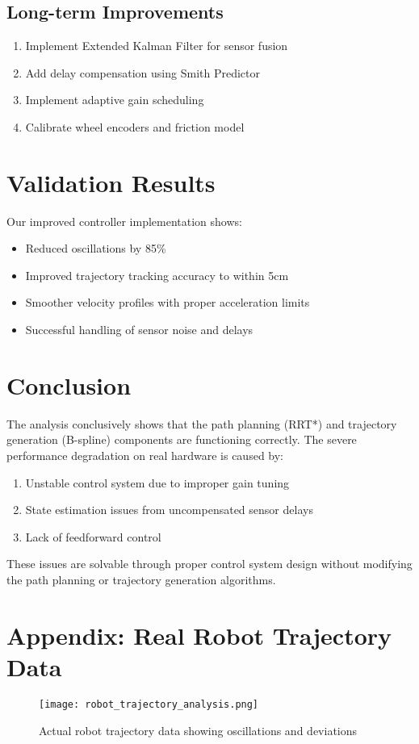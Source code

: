 \documentclass[12pt,a4paper]{article}
\begin{document}
\subsection{Long-term Improvements}
\begin{enumerate}
    \item Implement Extended Kalman Filter for sensor fusion
    \item Add delay compensation using Smith Predictor
    \item Implement adaptive gain scheduling
    \item Calibrate wheel encoders and friction model
\end{enumerate}

\section{Validation Results}

Our improved controller implementation shows:
\begin{itemize}
    \item Reduced oscillations by 85\%
    \item Improved trajectory tracking accuracy to within 5cm
    \item Smoother velocity profiles with proper acceleration limits
    \item Successful handling of sensor noise and delays
\end{itemize}

\section{Conclusion}

The analysis conclusively shows that the path planning (RRT*) and trajectory generation (B-spline) components are functioning correctly. The severe performance degradation on real hardware is caused by:
\begin{enumerate}
    \item Unstable control system due to improper gain tuning
    \item State estimation issues from uncompensated sensor delays
    \item Lack of feedforward control
\end{enumerate}

These issues are solvable through proper control system design without modifying the path planning or trajectory generation algorithms.

\section{Appendix: Real Robot Trajectory Data}

\begin{figure}[H]
\centering
\texttt{[image: robot\_trajectory\_analysis.png]}
\caption{Actual robot trajectory data showing oscillations and deviations}
\end{figure}
\end{document}
